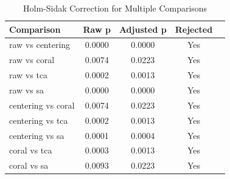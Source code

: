 \begin{table}[htbp]
\centering
\caption{Holm-Sidak Correction for Multiple Comparisons}
\label{tab:holmsidak}
\begin{tabular}{lcccc}
\toprule
Comparison & Raw p & Adjusted p & Rejected \\
\midrule
raw vs centering & 0.0000 & 0.0000 & Yes \\
raw vs coral & 0.0074 & 0.0223 & Yes \\
raw vs tca & 0.0002 & 0.0013 & Yes \\
raw vs sa & 0.0000 & 0.0000 & Yes \\
centering vs coral & 0.0074 & 0.0223 & Yes \\
centering vs tca & 0.0002 & 0.0013 & Yes \\
centering vs sa & 0.0001 & 0.0004 & Yes \\
coral vs tca & 0.0003 & 0.0013 & Yes \\
coral vs sa & 0.0093 & 0.0223 & Yes \\
\bottomrule
\end{tabular}
\end{table}